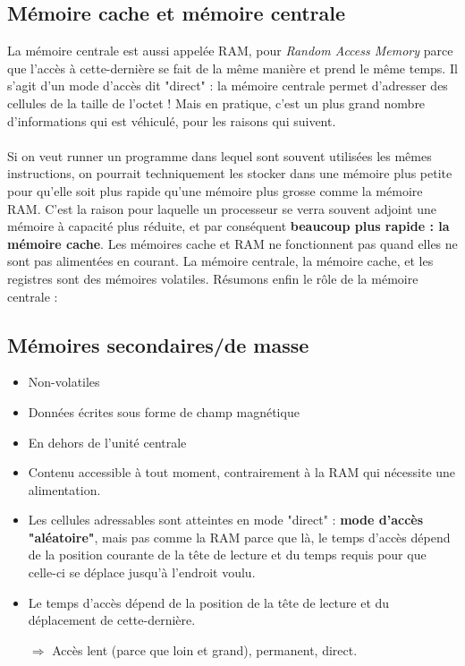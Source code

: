 \documentclass[12pt,a4paper]{report}
\begin{document}
\subsection{Mémoire cache et mémoire centrale}
La mémoire centrale est aussi appelée RAM, pour \textit{Random Access Memory} parce que l'accès à cette-dernière se fait de la même manière et prend le même temps. Il s'agit d'un mode d'accès dit "direct" : la mémoire centrale permet d'adresser des cellules de la taille de l'octet ! Mais en pratique, c'est un plus grand nombre d'informations qui est véhiculé, pour les raisons qui suivent. \\ \\
Si on veut runner un programme dans lequel sont souvent utilisées les mêmes instructions, on pourrait techniquement les stocker dans une mémoire plus petite pour qu'elle soit plus rapide qu'une mémoire plus grosse comme la mémoire RAM. C'est la raison pour laquelle un processeur se verra souvent adjoint une mémoire à capacité plus réduite, et par conséquent \textbf{beaucoup plus rapide : la mémoire cache}.  Les mémoires cache et RAM ne fonctionnent pas quand elles ne sont pas alimentées en courant. La mémoire centrale, la mémoire cache, et les registres sont des mémoires volatiles. Résumons enfin le rôle de la mémoire centrale :


\subsection{Mémoires secondaires/de masse}
\begin{itemize}
\item Non-volatiles
\item Données écrites sous forme de champ magnétique
\item En dehors de l'unité centrale
\item Contenu accessible à tout moment, contrairement à la RAM qui nécessite une alimentation.
\item Les cellules adressables sont atteintes en mode "direct" : \textbf{mode d'accès "aléatoire"}, mais pas comme la RAM parce que là, le temps d'accès dépend de la position courante de la tête de lecture et du temps requis pour que celle-ci se déplace jusqu'à l'endroit voulu.
\item Le temps d'accès dépend de la position de la tête de lecture et du déplacement de cette-dernière.
\item[$\Rightarrow$] Accès lent (parce que loin et grand), permanent, direct.
\end{itemize}
\end{document}
